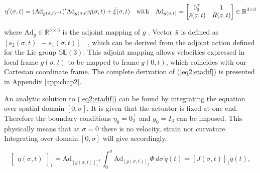 \begin{equation}
    \eta'(\sigma,t)= (\text{Ad}_{g(\sigma,t)^{-1}})'\text{Ad}_{g(\sigma,t)} \eta(\sigma,t) + \Dot{\xi}(\sigma,t) \hspace{10pt} \text{with} \hspace{10pt} \text{Ad}_{g(\sigma,t)} = \begin{bmatrix} 0_2^\top & 1 \\ \Tilde{s}(\sigma,t) & R(\sigma,t)  \end{bmatrix} \in \mathbb{R}^{3\times 3}
    \label{eq2:etadif}
\end{equation}


where $\text{Ad}_g \in \mathbb{R}^{3 \times 3}$ \cite{2DLie} is the adjoint mapping of $g$ \cite{Sola2018}. Vector $\Tilde{s}$ is defined as $[s_2(\sigma,t) \hspace{5pt} -s_1(\sigma,t)]^\top$ \cite{2DLie}, which can be derived from the adjoint action defined for the Lie group $\mathbb{SE}(3)$. This adjoint mapping allows velocities expressed in local frame $g(\sigma,t)$ to be mapped to frame $g(0,t)$, which coincides with our Cartesian coordinate frame. The complete derivation of (\ref{eq2:etadif}) is presented in Appendix \ref{app:chap2}. 

An analytic solution to (\ref{eq2:etadif}) can be found by integrating the equation over spatial domain $[0,\sigma]$. It is given that the actuator is fixed at one end. Therefore the boundary conditions $\eta_0 = 0_{3}^\top$ and $g_0 = I_{3}$ can be imposed. This physically means that at $\sigma = 0$ there is no velocity, strain nor curvature. Integrating over domain $[0,\sigma]$ will give accordingly,

\begin{equation}
  \begin{bmatrix} \eta(\sigma,t)\end{bmatrix}_1 = \text{Ad}_{[g(\sigma,t)]_1^{-1}} \int_0^{\sigma} \text{Ad}_{[g(\sigma,t)]_1} \Phi \hspace{2pt} d \sigma  \hspace{2pt} \dot{q}(t) = [J(\sigma,t)]_1\dot{q}(t),
    \label{eq2:J}
\end{equation}


